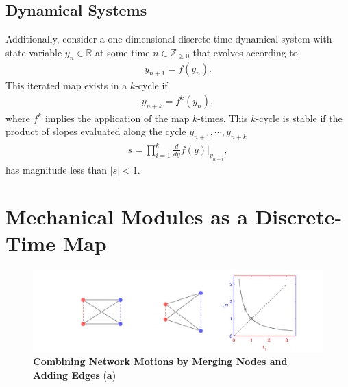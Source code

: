 \documentclass[12pt]{revtex4-1}
\newcommand{\real}{\mathbb{R}}
\begin{document}
\subsection{Dynamical Systems}
Additionally, consider a one-dimensional discrete-time dynamical system with state variable $y_n \in \real$ at some time $n \in \mathbb{Z}_{\geq 0}$ that evolves according to
\begin{align*}
y_{n+1} = f(y_n). 
\end{align*}
This iterated map exists in a $k$-cycle if
\begin{align*}
y_{n+k} = f^k(y_n),
\end{align*}
where $f^k$ implies the application of the map $k$-times. This $k$-cycle is stable if the product of slopes evaluated along the cycle $y_{n+1},\dotsm,y_{n+k}$
\begin{align*}
s = \prod_{i=1}^k \frac{d}{dy}f(y)\bigg|_{y_{n+i}},
\end{align*}
has magnitude less than $|s| < 1$. 




\section{Mechanical Modules as a Discrete-Time Map}

\begin{figure}[h!]
	\centering
	\includegraphics[width=1.0\columnwidth]{4bar.pdf}
	\caption{\textbf{Combining Network Motions by Merging Nodes and Adding Edges} (\textbf{a}) }
	\label{fig:mn_combine}
\end{figure}
\end{document}
